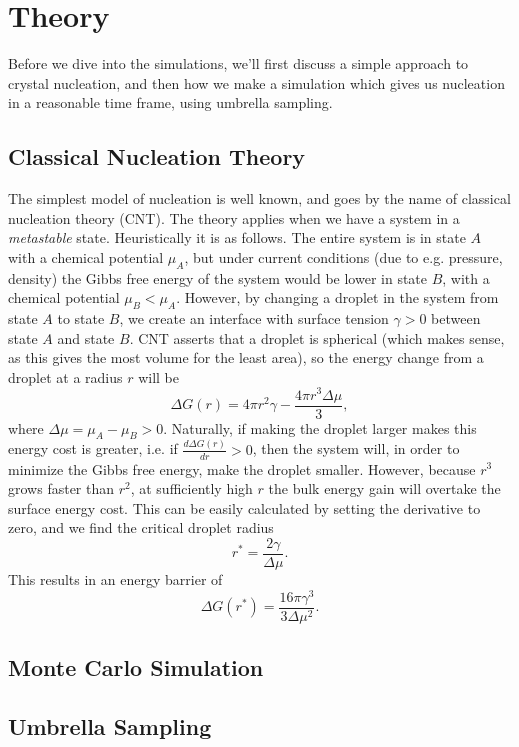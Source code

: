 \documentclass[thesis]{subfiles}
\begin{document}
\section{Theory}

Before we dive into the simulations, we'll first discuss a simple approach to crystal nucleation, and then how we make a simulation which gives us nucleation in a reasonable time frame, using umbrella sampling.

\subsection{Classical Nucleation Theory}

The simplest model of nucleation is well known, and goes by the name of classical nucleation theory (CNT). The theory applies when we have a system in a \emph{metastable} state. Heuristically it is as follows. The entire system is in state $A$ with a chemical potential $\mu_A$, but under current conditions (due to e.g. pressure, density) the Gibbs free energy of the system would be lower in state $B$, with a chemical potential $\mu_B < \mu_A$. However, by changing a droplet in the system from state $A$ to state $B$, we create an interface with surface tension $\gamma > 0$ between state $A$ and state $B$. CNT asserts that a droplet is spherical (which makes sense, as this gives the most volume for the least area), so the energy change from a droplet at a radius $r$ will be
\begin{equation}
	\Delta G(r) = 4\pi r^2 \gamma - \frac{4\pi r^3 \Delta\mu}{3},
\end{equation}
where $\Delta\mu = \mu_A - \mu_B > 0$. Naturally, if making the droplet larger makes this energy cost is greater, i.e. if $\frac{d\Delta G(r)}{dr} > 0$, %
then the system will, in order to minimize the Gibbs free energy, make the droplet smaller. However, because $r^3$ grows faster than $r^2$, at sufficiently high $r$ the bulk energy gain will overtake the surface energy cost. This can be easily calculated by setting the derivative to zero, and we find the critical droplet radius
\begin{equation}
	r^* = \frac{2\gamma}{\Delta\mu}.
\end{equation}
This results in an energy barrier of 
\begin{equation}
	\Delta G (r^*) = \frac{16 \pi \gamma^3}{3 \Delta\mu^2}.
\end{equation}


\subsection{Monte Carlo Simulation}

\subsection{Umbrella Sampling}
\end{document}
